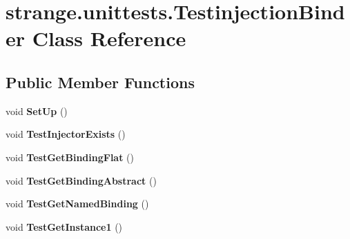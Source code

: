 \hypertarget{classstrange_1_1unittests_1_1_testinjection_binder}{\section{strange.\-unittests.\-Testinjection\-Binder Class Reference}
\label{classstrange_1_1unittests_1_1_testinjection_binder}
}
\subsection*{Public Member Functions}
\begin{DoxyCompactItemize}
\item 
\hypertarget{classstrange_1_1unittests_1_1_testinjection_binder_af5d28e7d1b9b1970940e4ed45c8f7535}{void {\bfseries Set\-Up} ()}\label{classstrange_1_1unittests_1_1_testinjection_binder_af5d28e7d1b9b1970940e4ed45c8f7535}

\item 
\hypertarget{classstrange_1_1unittests_1_1_testinjection_binder_a0c7be9682dcf9ead68b6a86b84947ee6}{void {\bfseries Test\-Injector\-Exists} ()}\label{classstrange_1_1unittests_1_1_testinjection_binder_a0c7be9682dcf9ead68b6a86b84947ee6}

\item 
\hypertarget{classstrange_1_1unittests_1_1_testinjection_binder_a08ab93ec07e479ada8bdb426a6897592}{void {\bfseries Test\-Get\-Binding\-Flat} ()}\label{classstrange_1_1unittests_1_1_testinjection_binder_a08ab93ec07e479ada8bdb426a6897592}

\item 
\hypertarget{classstrange_1_1unittests_1_1_testinjection_binder_ada164490acf6b084336ffb210a10d157}{void {\bfseries Test\-Get\-Binding\-Abstract} ()}\label{classstrange_1_1unittests_1_1_testinjection_binder_ada164490acf6b084336ffb210a10d157}

\item 
\hypertarget{classstrange_1_1unittests_1_1_testinjection_binder_a0271e05fbd4e57afdc0dc05f609a4e21}{void {\bfseries Test\-Get\-Named\-Binding} ()}\label{classstrange_1_1unittests_1_1_testinjection_binder_a0271e05fbd4e57afdc0dc05f609a4e21}

\item 
\hypertarget{classstrange_1_1unittests_1_1_testinjection_binder_ad8a5acd236637e3ef24a623429878e29}{void {\bfseries Test\-Get\-Instance1} ()}\label{classstrange_1_1unittests_1_1_testinjection_binder_ad8a5acd236637e3ef24a623429878e29}


\end{DoxyCompactItemize}

